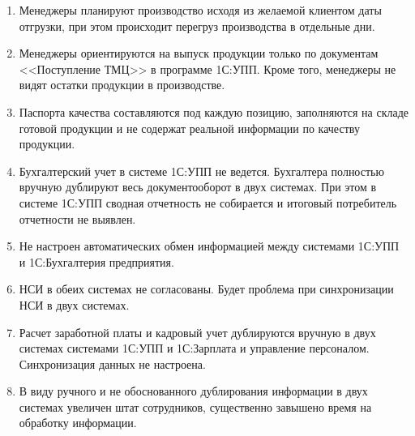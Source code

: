 \begin{enumerate}
\item Менеджеры планируют производство исходя из желаемой клиентом даты отгрузки, при этом происходит перегруз производства в отдельные дни. 



\item Менеджеры ориентируются на выпуск продукции только по документам <<Поступление ТМЦ>> в программе 1С:УПП. Кроме того, менеджеры не видят остатки продукции в производстве.




\item Паспорта качества составляются под каждую позицию, заполняются на складе готовой продукции и не содержат реальной информации по качеству продукции.


\item Бухгалтерский учет в системе 1С:УПП не ведется. Бухгалтера полностью вручную дублируют весь документооборот в двух системах.
При этом в системе 1С:УПП сводная отчетность не собирается и итоговый потребитель отчетности не выявлен.

\item Не настроен автоматических обмен информацией между системами 1С:УПП и 1С:Бухгалтерия предприятия.

\item НСИ в обеих системах не согласованы. Будет проблема при синхронизации НСИ в двух системах.


\item Расчет заработной платы и кадровый учет  дублируются вручную в двух системах системами 1С:УПП и 1С:Зарплата и управление персоналом. Синхронизация данных не настроена.

\item В виду ручного и не обоснованного дублирования информации в двух системах увеличен штат сотрудников, существенно завышено время на обработку информации.
  
\end{enumerate}

